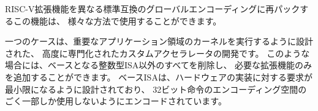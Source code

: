 \begin{comment}
This capability of repacking RISC-V extensions into different
standard-compatible global encodings can be used in a number of ways.
\end{comment}
RISC-V拡張機能を異なる標準互換のグローバルエンコーディングに再パックするこの機能は、
様々な方法で使用することができます。

\begin{comment}
One use-case is developing highly specialized custom accelerators,
designed to run kernels from important application domains.  These
might want to drop all but the base integer ISA and add in only the
extensions that are required for the task in hand.  The base ISA has
been designed to place minimal requirements on a hardware
implementation, and has been encoded to use only a small fraction of a
32-bit instruction encoding space.
\end{comment}
一つのケースは、重要なアプリケーション領域のカーネルを実行するように設計された、
高度に専門化されたカスタムアクセラレータの開発です。
このような場合には、ベースとなる整数型ISA以外のすべてを削除し、
必要な拡張機能のみを追加することができます。
ベースISAは、ハードウェアの実装に対する要求が最小限になるように設計されており、
32ビット命令のエンコーディング空間のごく一部しか使用しないようにエンコードされています。


